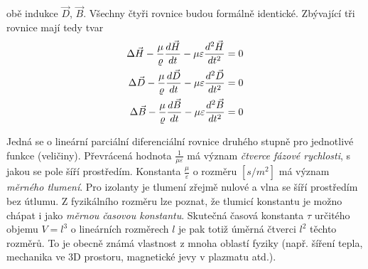 {    obě indukce \(\vec{D}\), \(\vec{B}\). Všechny čtyři rovnice budou formálně identické. Zbývající 
    tři rovnice mají tedy tvar
    \begin{subequations}
      \begin{align}
        \Delta\vec{H} - \frac{\mu}{\varrho}\dfrac{d \vec{H}}{d t} 
          - \mu\varepsilon\dfrac{d^2 \vec{H}}{d t^2} &= 0   \label{ES:eq_elmagp06a}          \\
        \Delta\vec{D} - \frac{\mu}{\varrho}\dfrac{d \vec{D}}{d t} 
          - \mu\varepsilon\dfrac{d^2 \vec{D}}{d t^2} &= 0   \label{ES:eq_elmagp06b}          \\
        \Delta\vec{B} - \frac{\mu}{\varrho}\dfrac{d \vec{B}}{d t} 
          - \mu\varepsilon\dfrac{d^2 \vec{B}}{d t^2} &= 0   \label{ES:eq_elmagp06c}
      \end{align}
    \end{subequations}

    
    Jedná se o lineární parciální diferenciální rovnice druhého stupně pro jednotlivé funkce 
    (veličiny). Převrácená hodnota \(\frac{1}{\mu\varepsilon}\) má význam \emph{čtverce fázové 
    rychlosti}, s jakou se pole šíří prostředím. Konstanta \(\frac{\mu}{\varepsilon}\) o rozměru 
    \([s/m^2]\) má význam \emph{měrného tlumení}. Pro izolanty je tlumení zřejmě nulové a vlna se 
    šíří prostředím bez útlumu. Z fyzikálního rozměru lze poznat, že tlumicí konstantu je možno 
    chápat i jako \emph{měrnou časovou konstantu}. Skutečná časová konstanta \(\tau\) určitého 
    objemu \(V=l^3\) o lineárních rozměrech \(l\) je pak totiž úměrná čtverci \(l^2\) těchto 
    rozměrů. To je obecně známá vlastnost z mnoha oblastí fyziky (např. šíření tepla, mechanika ve 
    3D prostoru, magnetické jevy v plazmatu atd.).
  
}
